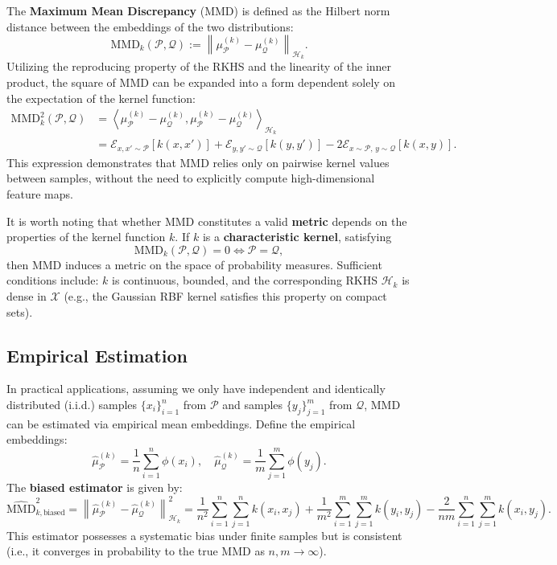\documentclass{article}
\theoremstyle{plain}
\theoremstyle{definition}
\theoremstyle{remark}
\begin{document}
The \textbf{Maximum Mean Discrepancy} (MMD) is defined as the Hilbert norm distance between the embeddings of the two distributions:
\begin{equation}
    \mathrm{MMD}_k(\mathcal{P}, \mathcal{Q})
    := \left\| \mu_{\mathcal{P}}^{(k)} - \mu_{\mathcal{Q}}^{(k)} \right\|_{\mathcal{H}_k}.
\end{equation}
Utilizing the reproducing property of the RKHS and the linearity of the inner product, the square of MMD can be expanded into a form dependent solely on the expectation of the kernel function:
\begin{align}
    \mathrm{MMD}_k^2(\mathcal{P}, \mathcal{Q})
    &= \left\langle \mu_{\mathcal{P}}^{(k)} - \mu_{\mathcal{Q}}^{(k)}, \mu_{\mathcal{P}}^{(k)} - \mu_{\mathcal{Q}}^{(k)} \right\rangle_{\mathcal{H}_k} \nonumber \\
    &= \mathcal{E}_{x, x' \sim \mathcal{P}}[k(x, x')]
      + \mathcal{E}_{y, y' \sim \mathcal{Q}}[k(y, y')]
      - 2\mathcal{E}_{x \sim \mathcal{P},\, y \sim \mathcal{Q}}[k(x, y)].
\end{align}
This expression demonstrates that MMD relies only on pairwise kernel values between samples, without the need to explicitly compute high-dimensional feature maps.

It is worth noting that whether MMD constitutes a valid \textbf{metric} depends on the properties of the kernel function $k$. If $k$ is a \textbf{characteristic kernel}, satisfying
\[
    \mathrm{MMD}_k(\mathcal{P}, \mathcal{Q}) = 0 \iff \mathcal{P} = \mathcal{Q},
\]
then MMD induces a metric on the space of probability measures. Sufficient conditions include: $k$ is continuous, bounded, and the corresponding RKHS $\mathcal{H}_k$ is dense in $\mathcal{X}$ (e.g., the Gaussian RBF kernel satisfies this property on compact sets).

\subsection{Empirical Estimation}
In practical applications, assuming we only have independent and identically distributed (i.i.d.) samples $\{x_i\}_{i=1}^n$ from $\mathcal{P}$ and samples $\{y_j\}_{j=1}^m$ from $\mathcal{Q}$, MMD can be estimated via empirical mean embeddings. Define the empirical embeddings:
\[
    \hat{\mu}_{\mathcal{P}}^{(k)} = \frac{1}{n} \sum_{i=1}^n \phi(x_i), \quad
    \hat{\mu}_{\mathcal{Q}}^{(k)} = \frac{1}{m} \sum_{j=1}^m \phi(y_j).
\]
The \textbf{biased estimator} is given by:
\begin{equation}
    \widehat{\mathrm{MMD}}_{k,\text{biased}}^2 = \left\| \hat{\mu}_{\mathcal{P}}^{(k)} - \hat{\mu}_{\mathcal{Q}}^{(k)} \right\|_{\mathcal{H}_k}^2
    = \frac{1}{n^2}\sum_{i=1}^n\sum_{j=1}^n k(x_i, x_j)
    + \frac{1}{m^2}\sum_{i=1}^m\sum_{j=1}^m k(y_i, y_j)
    - \frac{2}{nm}\sum_{i=1}^n\sum_{j=1}^m k(x_i, y_j).
\end{equation}
This estimator possesses a systematic bias under finite samples but is consistent (i.e., it converges in probability to the true MMD as $n,m \to \infty$).
\end{document}
